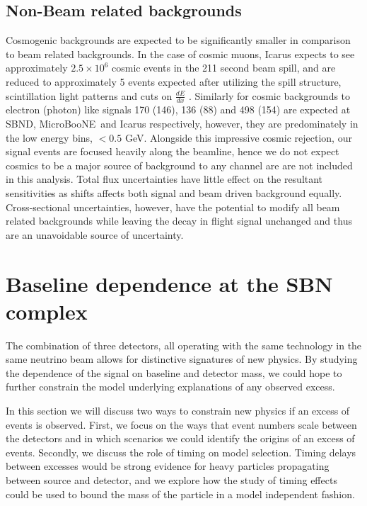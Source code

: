 \documentclass[11pt, a4paper]{article}
\def\muboone{MicroBooNE}
\begin{document}
\subsection{Non-Beam related backgrounds}
Cosmogenic backgrounds are expected to be significantly smaller in comparison to beam related backgrounds. In the case of cosmic muons, Icarus expects to see approximately $2.5 \times 10^{6}$ cosmic events in the 211 second beam spill,
and are reduced to approximately 5 events expected after utilizing the spill
structure, scintillation light patterns and cuts on $\frac{d E}{d x}$
\cite{Antonello:2015lea}. Similarly for cosmic backgrounds to electron (photon)
like signals 170 (146), 136 (88) and 498 (154) are expected at SBND, \muboone\
and Icarus respectively, however, they are predominately in the low energy
bins, $< 0.5$ GeV. Alongside this impressive cosmic rejection, our signal
events are focused heavily along the beamline, hence we do not expect cosmics
to be a major source of background to any channel are are not included in this
analysis. Total flux uncertainties have little effect on the resultant
sensitivities as shifts affects both signal and beam driven background equally.
Cross-sectional uncertainties, however, have the potential to modify all beam
related backgrounds while leaving the decay in flight signal unchanged and thus
are an unavoidable source of uncertainty.




\section{\label{sec:baselineinterplay}Baseline dependence at the SBN complex}
The combination of three detectors, all operating with the same technology in
the same neutrino beam allows for distinctive signatures of new physics. By
studying the dependence of the signal on baseline and detector mass, we could
hope to further constrain the model underlying explanations of any observed
excess.  

In this section we will discuss two ways to constrain new physics if an excess
of events is observed. First, we focus on the ways that event numbers scale
between the detectors and in which scenarios we could identify the origins of
an excess of events. Secondly, we discuss the role of timing on model selection.
Timing delays between excesses would be strong evidence for heavy particles 
propagating between source and detector, and we explore how the study of timing
effects could be used to bound the mass of the particle in a model independent 
fashion.
\end{document}
